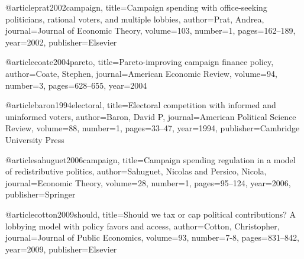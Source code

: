 @article{prat2002campaign,
  title={Campaign spending with office-seeking politicians, rational voters, and multiple lobbies},
  author={Prat, Andrea},
  journal={Journal of Economic Theory},
  volume={103},
  number={1},
  pages={162--189},
  year={2002},
  publisher={Elsevier}
}

@article{coate2004pareto,
  title={Pareto-improving campaign finance policy},
  author={Coate, Stephen},
  journal={American Economic Review},
  volume={94},
  number={3},
  pages={628--655},
  year={2004}
}

@article{baron1994electoral,
  title={Electoral competition with informed and uninformed voters},
  author={Baron, David P},
  journal={American Political Science Review},
  volume={88},
  number={1},
  pages={33--47},
  year={1994},
  publisher={Cambridge University Press}
}

@article{sahuguet2006campaign,
  title={Campaign spending regulation in a model of redistributive politics},
  author={Sahuguet, Nicolas and Persico, Nicola},
  journal={Economic Theory},
  volume={28},
  number={1},
  pages={95--124},
  year={2006},
  publisher={Springer}
}

@article{cotton2009should,
  title={Should we tax or cap political contributions? A lobbying model with policy favors and access},
  author={Cotton, Christopher},
  journal={Journal of Public Economics},
  volume={93},
  number={7-8},
  pages={831--842},
  year={2009},
  publisher={Elsevier}
}

